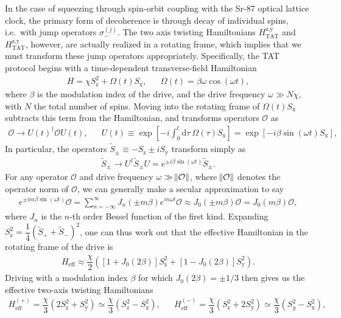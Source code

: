 \documentclass[aps,notitlepage,nofootinbib,11pt]{revtex4-1}
\renewcommand{\t}{\text} %
\newcommand{\f}[2]{\dfrac{#1}{#2}} %
\newcommand{\p}[1]{\left(#1\right)} %
\renewcommand{\sp}[1]{\left[#1\right]} %
\renewcommand{\d}{\text{d}} %
\renewcommand{\O}{\mathcal{O}}
\newcommand{\z}{\text{z}}
\newcommand{\x}{\text{x}}
\newcommand{\y}{\text{y}}
\newcommand{\1}{\mathds{1}}
\begin{document}
In the case of squeezing through spin-orbit coupling with the Sr-87
optical lattice clock, the primary form of decoherence is through
decay of individual spins, i.e.~with jump operators $\sigma_-^{(j)}$.
The two axis twisting Hamiltonians $H_{\t{TAT}}^{\z,\y}$ and
$H_{\t{TAT}}^{\z,\y}$, however, are actually realized in a rotating
frame, which implies that we must transform these jump operators
appropriately.  Specifically, the TAT protocol begins with a
time-dependent transverse-field Hamiltonian
\begin{align}
  H = \chi S_\z^2 + \Omega\p{t} S_\x,
  &&
  \Omega\p{t} = \beta\omega \cos\p{\omega t},
\end{align}
where $\beta$ is the modulation index of the drive, and the drive
frequency $\omega\gg N\chi$, with $N$ the total number of spins.
Moving into the rotating frame of $\Omega\p{t}S_\x$ subtracts this
term from the Hamiltonian, and transforms operators $\O$ as
\begin{align}
  \O \to U\p{t}^\dag \O U\p{t},
  &&
  U\p{t} \equiv \exp\sp{-i\int_0^t\d\tau~\Omega\p{\tau}S_\x}
  = \exp\sp{-i\beta\sin\p{\omega t}S_\x},
\end{align}
In particular, the operators $\tilde S_\pm\equiv-S_\z\pm iS_\y$
transform simply as
\begin{align}
  \tilde S_\pm
  \to U^\dag \tilde S_\pm U
  = e^{\pm i\beta\sin\p{\omega t}} \tilde S_\pm.
\end{align}
For any operator $\O$ and drive frequency $\omega\gg\norm{\O}$, where
$\norm{\O}$ denotes the operator norm of $\O$, we can generally make a
secular approximation to say
\begin{align}
  e^{\pm im\beta\sin\p{\omega t}} \O
  = \sum_{n=-\infty}^\infty J_n\p{\pm m\beta} e^{in\omega t} \O
  \approx J_0\p{\pm m\beta} \O
  = J_0\p{m\beta} \O,
\end{align}
where $J_n$ is the $n$-th order Bessel function of the first kind.
Expanding $S_\z^2=\f14\p{\tilde S_+ + \tilde S_-}^2$, one can thus
work out that the effective Hamiltonian in the rotating frame of the
drive is
\begin{align}
  H_{\t{eff}}
  \approx \f{\chi}{2} \p{\sp{1+J_0\p{2\beta}} S_\z^2
    + \sp{1-J_0\p{2\beta}} S_\y^2}.
\end{align}
Driving with a modulation index $\beta$ for which
$J_0\p{2\beta}=\pm1/3$ then gives us the effective two-axis twisting
Hamiltonians
\begin{align}
  H_{\t{eff}}^{(+)}
  = \f{\chi}{3} \p{2 S_\z^2 + S_\y^2}
  \simeq \f{\chi}{3} \p{S_\z^2 - S_\x^2},
  &&
  H_{\t{eff}}^{(-)}
  = \f{\chi}{3} \p{S_\z^2 + 2 S_\y^2}
  \simeq \f{\chi}{3} \p{S_y^2 - S_\x^2},
\end{align}
\end{document}
